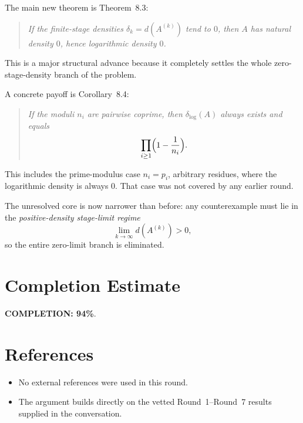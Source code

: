 The main new theorem is Theorem~8.3:
\begin{quote}
\emph{If the finite-stage densities $\delta_k=d(A^{(k)})$ tend to $0$, then $A$ has natural density $0$, hence logarithmic density $0$.}
\end{quote}
This is a major structural advance because it completely settles the whole zero-stage-density branch of the problem.

A concrete payoff is Corollary~8.4:
\begin{quote}
\emph{If the moduli $n_i$ are pairwise coprime, then $\delta_{\log}(A)$ always exists and equals}
\[
\prod_{i\ge 1}\Bigl(1-\frac1{n_i}\Bigr).
\]
\end{quote}
This includes the prime-modulus case $n_i=p_i$, arbitrary residues, where the logarithmic density is always $0$.
That case was not covered by any earlier round.

The unresolved core is now narrower than before:
any counterexample must lie in the \emph{positive-density stage-limit regime}
\[
\lim_{k\to\infty} d(A^{(k)})>0,
\]
so the entire zero-limit branch is eliminated.

\section{Completion Estimate}
\textbf{COMPLETION: 94\%}.

\section{References}
\begin{itemize}
\item No external references were used in this round.
\item The argument builds directly on the vetted Round~1--Round~7 results supplied in the conversation.
\end{itemize}
